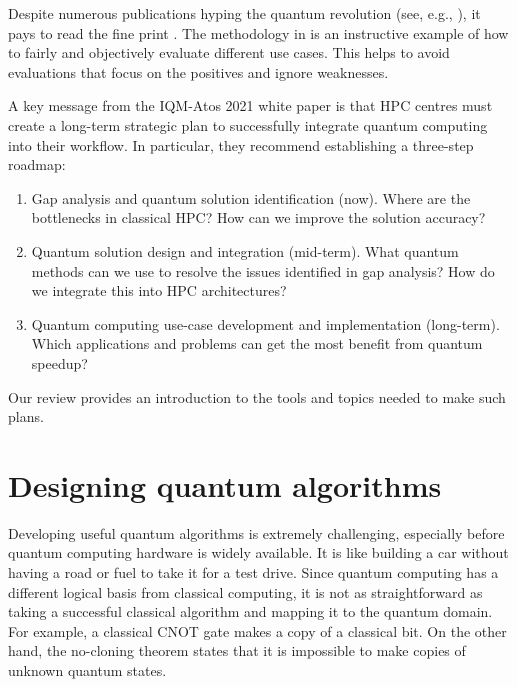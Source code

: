 \documentclass[10pt]{iopart}
\begin{document}
Despite numerous publications hyping the quantum revolution (see, e.g., \cite{Arute2019,Wu2021,Kim2023a}), it pays to read the fine print \cite{Leymann2020,Coveney2020,Aaronson2015}. The methodology in \cite{Chancellor2020} is an instructive example of how to fairly and objectively evaluate different use cases. This helps to avoid evaluations that focus on the positives and ignore weaknesses. 

A key message from the IQM-Atos 2021 white paper \cite{IQM2021} is that HPC centres must create a long-term strategic plan to successfully integrate quantum computing into their workflow. In particular, they recommend establishing a three-step roadmap:
\begin{enumerate}
\item Gap analysis and quantum solution identification (now). Where are the bottlenecks in classical HPC? How can we improve the solution accuracy?
\item Quantum solution design and integration (mid-term). What quantum methods can we use to resolve the issues identified in gap analysis? How do we integrate this into HPC architectures?
\item Quantum computing use-case development and implementation (long-term). Which applications and problems can get the most benefit from quantum speedup?
\end{enumerate}
Our review provides an introduction to the tools and topics needed to make such plans.



\section{Designing quantum algorithms}\label{sec:design}

Developing useful quantum algorithms is extremely challenging, especially before quantum computing hardware is widely available. It is like building a car without having a road or fuel to take it for a test drive. Since quantum computing has a different logical basis from classical computing, it is not as straightforward as taking a successful classical algorithm and mapping it to the quantum domain. For example, a classical CNOT gate makes a copy of a classical bit. On the other hand, the no-cloning theorem \cite{Wootters1982} states that it is impossible to make copies of unknown quantum states. 
\end{document}
